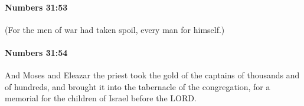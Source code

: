 		\paragraph{Numbers 31:53} %
			\label{NUMBERS-31-53}

			(For the men of war had taken spoil, every man for himself.)


		\paragraph{Numbers 31:54} %
			\label{NUMBERS-31-54}

			And Moses and Eleazar the priest took the gold of the captains of thousands and of hundreds, and brought it into the tabernacle of the congregation, for a memorial for the children of Israel before the LORD.

